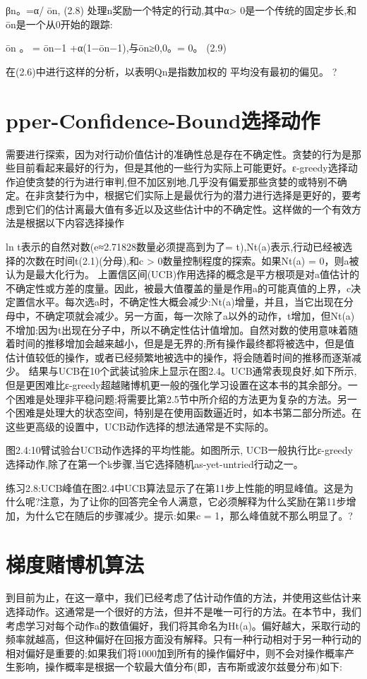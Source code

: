 βn。=α/ ōn, 					(2.8)
处理n奖励一个特定的行动,其中α> 0是一个传统的固定步长,和ōn是一个从0开始的跟踪:

ōn
。
= ōn−1 +α(1−ōn−1),与ōn≥0,0。= 0。 					(2.9)

在(2.6)中进行这样的分析，以表明Qn是指数加权的
平均没有最初的偏见。 					?


\section{pper-Confidence-Bound选择动作}

需要进行探索，因为对行动价值估计的准确性总是存在不确定性。贪婪的行为是那些目前看起来最好的行为，但是其他的一些行为实际上可能更好。ε-greedy选择动作迫使贪婪的行为进行审判,但不加区别地,几乎没有偏爱那些贪婪的或特别不确定。在非贪婪行为中，根据它们实际上是最优行为的潜力进行选择是更好的，要考虑到它们的估计离最大值有多近以及这些估计中的不确定性。这样做的一个有效方法是根据以下内容选择操作

ln t表示的自然对数(e≈2.71828数量必须提高到为了= t),Nt(a)表示,行动已经被选择的次数在时间t(2.1)(分母),和c > 0数量控制程度的探索。如果Nt(a) = 0，则a被认为是最大化行为。
上置信区间(UCB)作用选择的概念是平方根项是对a值估计的不确定性或方差的度量。因此，被最大值覆盖的量是作用a的可能真值的上界，c决定置信水平。每次选a时，不确定性大概会减少:Nt(a)增量，并且，当它出现在分母中，不确定项就会减少。另一方面，每一次除了a以外的动作，t增加，但Nt(a)不增加;因为t出现在分子中，所以不确定性估计值增加。自然对数的使用意味着随着时间的推移增加会越来越小，但是是无界的;所有操作最终都将被选中，但是值估计值较低的操作，或者已经频繁地被选中的操作，将会随着时间的推移而逐渐减少。
结果与UCB在10个武装试验床上显示在图2.4。UCB通常表现良好,如下所示,但是更困难比ε-greedy超越赌博机更一般的强化学习设置在这本书的其余部分。一个困难是处理非平稳问题;将需要比第2.5节中所介绍的方法更为复杂的方法。另一个困难是处理大的状态空间，特别是在使用函数逼近时，如本书第二部分所述。在这些更高级的设置中，UCB动作选择的想法通常是不实际的。


图2.4:10臂试验台UCB动作选择的平均性能。如图所示,
UCB一般执行比ε-greedy选择动作,除了在第一个k步骤,当它选择随机as-yet-untried行动之一。


练习2.8:UCB峰值在图2.4中UCB算法显示了在第11步上性能的明显峰值。这是为什么呢?注意，为了让你的回答完全令人满意，它必须解释为什么奖励在第11步增加，为什么它在随后的步骤减少。提示:如果c = 1，那么峰值就不那么明显了。?

\section{梯度赌博机算法}
到目前为止，在这一章中，我们已经考虑了估计动作值的方法，并使用这些估计来选择动作。这通常是一个很好的方法，但并不是唯一可行的方法。在本节中，我们考虑学习对每个动作a的数值偏好，我们将其命名为Ht(a)。偏好越大，采取行动的频率就越高，但这种偏好在回报方面没有解释。只有一种行动相对于另一种行动的相对偏好是重要的;如果我们将1000加到所有的操作偏好中，则不会对操作概率产生影响，操作概率是根据一个软最大值分布(即，吉布斯或波尔兹曼分布)如下:


